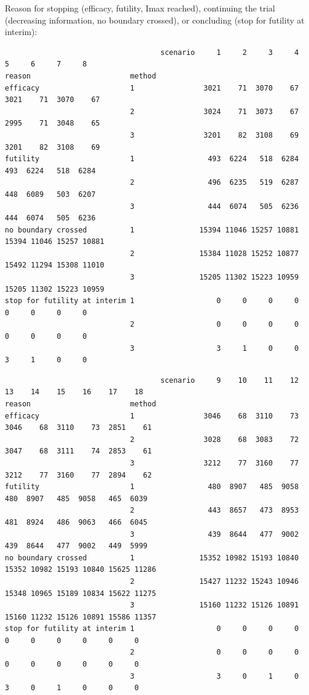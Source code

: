 \documentclass[12pt]{article}
\begin{document}
Reason for stopping (efficacy, futility, Imax reached), continuing the
trial (decreasing information, no boundary crossed), or concluding
(stop for futility at interim):
\begin{verbatim}
                                    scenario     1     2     3     4     5     6     7     8
reason                       method                                                         
efficacy                     1                3021    71  3070    67  3021    71  3070    67
                             2                3024    71  3073    67  2995    71  3048    65
                             3                3201    82  3108    69  3201    82  3108    69
futility                     1                 493  6224   518  6284   493  6224   518  6284
                             2                 496  6235   519  6287   448  6089   503  6207
                             3                 444  6074   505  6236   444  6074   505  6236
no boundary crossed          1               15394 11046 15257 10881 15394 11046 15257 10881
                             2               15384 11028 15252 10877 15492 11294 15308 11010
                             3               15205 11302 15223 10959 15205 11302 15223 10959
stop for futility at interim 1                   0     0     0     0     0     0     0     0
                             2                   0     0     0     0     0     0     0     0
                             3                   3     1     0     0     3     1     0     0
\end{verbatim}

\begin{verbatim}
                                    scenario     9    10    11    12    13    14    15    16    17    18
reason                       method                                                                     
efficacy                     1                3046    68  3110    73  3046    68  3110    73  2851    61
                             2                3028    68  3083    72  3047    68  3111    74  2853    61
                             3                3212    77  3160    77  3212    77  3160    77  2894    62
futility                     1                 480  8907   485  9058   480  8907   485  9058   465  6039
                             2                 443  8657   473  8953   481  8924   486  9063   466  6045
                             3                 439  8644   477  9002   439  8644   477  9002   449  5999
no boundary crossed          1               15352 10982 15193 10840 15352 10982 15193 10840 15625 11286
                             2               15427 11232 15243 10946 15348 10965 15189 10834 15622 11275
                             3               15160 11232 15126 10891 15160 11232 15126 10891 15586 11357
stop for futility at interim 1                   0     0     0     0     0     0     0     0     0     0
                             2                   0     0     0     0     0     0     0     0     0     0
                             3                   3     0     1     0     3     0     1     0     0     0
\end{verbatim}
\end{document}
